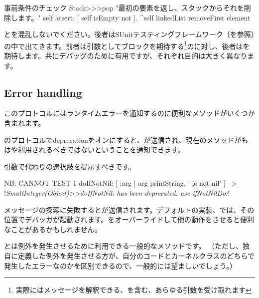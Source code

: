 \documentclass[a4paper,10pt,twoside]{book}
\begin{document}
\begin{method}{事前条件のチェック}
Stack>>>pop
    "最初の要素を返し、スタックからそれを削除します。"
    self assert: [ self isEmpty not ].
    ^self linkedList removeFirst element
\end{method}

とを混乱しないでください。後者はSUnitテスティングフレームワーク（を参照）の中で出てきます。前者は引数としてブロックを期待する\footnote{実際にはメッセージを解釈できる、を含む、あらゆる引数を受け取れます}のに対し、後者はを期待します。共にデバッグのために有用ですが、それぞれ目的は大きく異なります。

\subsection{Error handling}

このプロトコルにはランタイムエラーを通知するのに便利なメソッドがいくつか含まれます。

のプロトコルでdeprecationをオンにすると、が送信され、現在のメソッドがもはや利用されるべきではないということを通知できます。

引数で代わりの選択肢を提示すべきです。

\begin{code}{NB: CANNOT TEST}
1 doIfNotNil: [ :arg | arg printString, ' is not nil' ]
  --> !\emph{SmallInteger(Object)>>doIfNotNil: has been deprecated. use ifNotNilDo:}!
\end{code}

メッセージの探索に失敗するとが送信されます。デフォルトの実装、\ie{}では、その位置でデバッガが起動されます。をオーバーライドして他の動作をさせると便利なことがあるかもしれません。


とは例外を発生させるために利用できる一般的なメソッドです。
（ただし、独自に定義した例外を発生させる方が、自分のコードとカーネルクラスのどちらで発生したエラーなのかを区別できるので、一般的には望ましいでしょう。）
\end{document}
